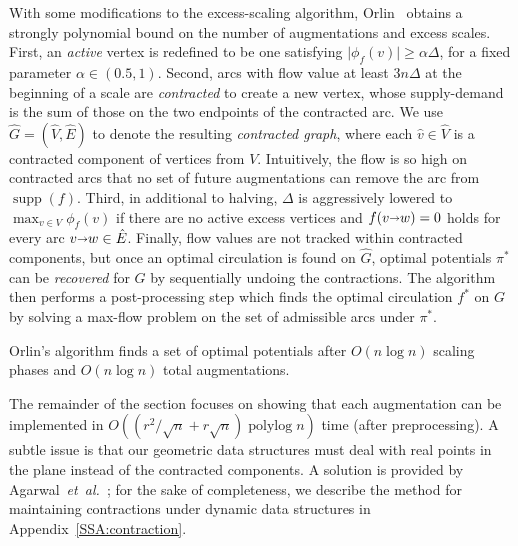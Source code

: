 \documentclass[a4paper,UKenglish]{socg-lipics-v2018}
\def\etal{\emph{et~al.}}
\def\etal{\textit{et~al.}}
\def\polylog{\mathop{\mathrm{polylog}}}
\def\abs#1{\mathopen| #1 \mathclose|}		%
\def\fsupply{\phi}
\def\arcto{\mathord\shortrightarrow}
\def\arc#1#2{#1\arcto#2}
\def\supp{\operatorname{supp}}
\theoremstyle{plain}
\numberwithin{figure}{section}
\def\EMPH#1{\textcolor{BrickRed}{{\emph{#1}}}}
\begin{document}
\begin{toappendix}
With some modifications to the excess-scaling algorithm, Orlin~\cite{O93}
obtains a strongly polynomial bound on the number of
augmentations and excess scales.
First, an \EMPH{active} vertex is redefined to be one satisfying
$\abs{\fsupply_f(v)} \geq \alpha\Delta$, for a fixed parameter $\alpha \in (0.5, 1)$.
Second, arcs with flow value at least $3n\Delta$ at the beginning of a scale
are \EMPH{contracted} to create a new vertex, whose supply-demand is
the sum of those on the two endpoints of the contracted arc.
We use $\hat{G} = (\hat{V}, \hat{E})$ to denote the resulting
\EMPH{contracted graph}, where each $\hat{v} \in \hat{V}$ is a contracted
component of vertices from $V$.
Intuitively, the flow is so high on contracted arcs that no set of future
augmentations can remove the arc from $\supp(f)$.
Third, in additional to halving, $\Delta$ is aggressively lowered to $\max_{v \in V} \fsupply_f(v)$ if there are no
active excess vertices and $f(\arc vw) = 0$ holds for every arc $\arc vw \in \hat{E}$.
Finally, flow values are not tracked within contracted components, but once an
optimal circulation is found on $\hat{G}$, optimal potentials $\pi^*$ can be
\EMPH{recovered} for $G$ by sequentially undoing the contractions.
The algorithm then performs a post-processing step which finds the optimal
circulation $f^*$ on $G$ by solving a max-flow problem on the set of admissible
arcs under $\pi^*$.

\end{toappendix}

\begin{theorem}
\label{theorem:orlin_old}
Orlin's algorithm finds a set of optimal potentials after $O(n\log n)$ scaling phases
and $O(n\log n)$ total augmentations.
\end{theorem}

The remainder of the section focuses on showing that each augmentation can be
implemented in $O((r^2/\sqrt{n}+r\sqrt{n})\polylog n)$ time (after preprocessing).
%
A subtle issue is that our geometric data structures must deal with real points
in the plane instead of the contracted components.
A solution is provided by Agarwal~\etal~\cite{AFPVX17};
for the sake of completeness, we describe the method for maintaining
contractions under dynamic data structures in Appendix~\ref{SSA:contraction}.
\end{document}
